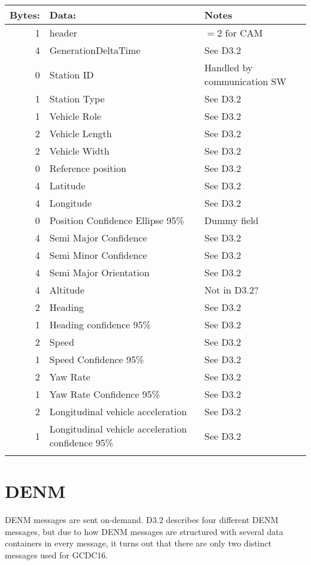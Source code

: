 \documentclass[11pt]{article}
\begin{document}
\begin{center}
\begin{tabular}{rll}
\hline
Bytes: & Data: & Notes\\
\hline
1 & header & \(=2\) for CAM\\
4 & GenerationDeltaTime & See D3.2\\
0 & Station ID & Handled by communication SW\\
1 & Station Type & See D3.2\\
1 & Vehicle Role & See D3.2\\
2 & Vehicle Length & See D3.2\\
2 & Vehicle Width & See D3.2\\
0 & Reference position & See D3.2\\
4 & Latitude & See D3.2\\
4 & Longitude & See D3.2\\
0 & Position Confidence Ellipse 95\% & Dummy field\\
4 & Semi Major Confidence & See D3.2\\
4 & Semi Minor Confidence & See D3.2\\
4 & Semi Major Orientation & See D3.2\\
4 & Altitude & Not in D3.2?\\
2 & Heading & See D3.2\\
1 & Heading confidence 95\% & See D3.2\\
2 & Speed & See D3.2\\
1 & Speed Confidence 95\% & See D3.2\\
2 & Yaw Rate & See D3.2\\
1 & Yaw Rate Confidence 95\% & See D3.2\\
2 & Longitudinal vehicle acceleration & See D3.2\\
1 & Longitudinal vehicle acceleration confidence 95\% & See D3.2\\
 &  & \\
\end{tabular}
\end{center}


\newpage
\section{DENM}
\label{sec:orgheadline3}
DENM messages are sent on-demand. D3.2 describes four different DENM
messages, but due to how DENM messages are structured with several
data containers in every message, it turns out that there are only two
distinct messages used for GCDC16.
\end{document}
